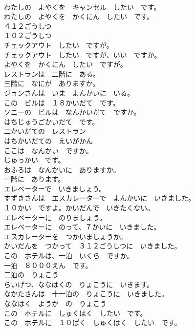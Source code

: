 \documentclass[8pt]{extreport}
\begin{document}
\begin{CJK}{UTF8}{min}
\\	わたしの　よやくを　キャンセル　したい　です。	
\\	わたしの　よやくを　かくにん　したい　です。	
\\	４１２ごうしつ	
\\	１０２ごうしつ	
\\	チェックアウト　したい　ですが。	
\\	チェックアウト　したい　ですが、いい　ですか。	
\\	よやくを　かくにん　したい　ですが。	
\\	レストランは　二階に　ある。	
\\	三階に　なにが　ありますか。	
\\	ジョンさんは　いま　よんかいに　いる。	
\\	この　ビルは　１８かいだて　です。	
\\	ソニーの　ビルは　なんかいだて　ですか。	
\\	はちじゅうごかいだて　です。	
\\	二かいだての　レストラン	
\\	はちかいだての　えいがかん	
\\	ここは　なんかい　ですか。	
\\	じゅっかい　です。	
\\	おふろは　なんかいに　ありますか。	
\\	一階に　あります。	
\\	エレベーターで　いきましょう。	
\\	すずきさんは　エスカレーターで　よんかいに　いきました。	
\\	１０かい　ですよ。かいだんで　いきたくない。	
\\	エレベーターに　のりましょう。	
\\	エレベーターに　のって、７かいに　いきました。	
\\	エスカレーターを　つかいましょうか。	
\\	かいだんを　つかって　３１２ごうしつに　いきました。	
\\	この　ホテルは、一泊　いくら　ですか。	
\\	一泊　８０００えん　です。	
\\	二泊の　りょこう	
\\	らいげつ、ななはくの　りょこうに　いきます。	
\\	なかたさんは　十一泊の　りょこうに　いきました。	
\\	ななはく　ようか　の　りょこう	
\\	この　ホテルに　しゅくはく　したい　です。	
\\	この　ホテルに　１０ぱく　しゅくはく　したい　です。	

\end{CJK}
\end{document}
